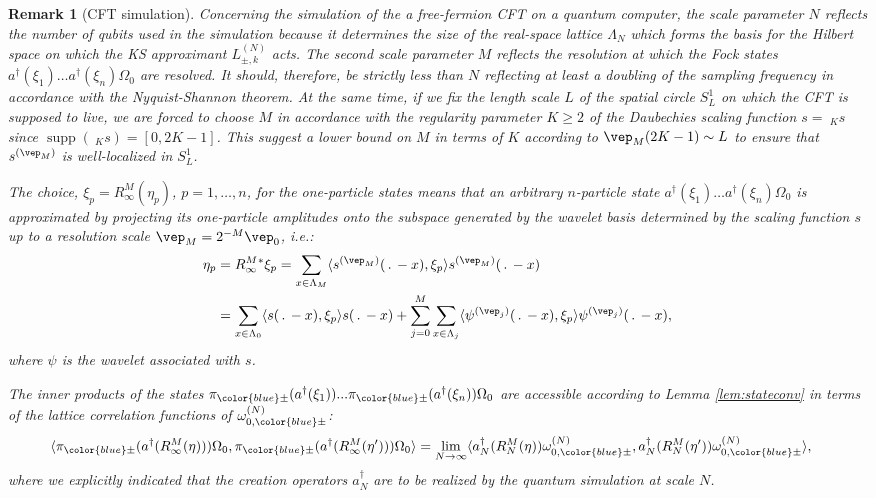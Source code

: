 \documentclass[a4paper, 11pt]{article}
\DeclareMathOperator{\1}{\mathds{1}}
\DeclareMathOperator{\supp}{supp}
\newtheorem{rem}[thm]{Remark}
\begin{document}
\begin{rem}[CFT simulation]
\label{rem:stateapprox}
Concerning the simulation of the a free-fermion CFT on a quantum computer, the scale parameter $N$ reflects the number of qubits used in the simulation because it determines the size of the real-space lattice $\Lambda_{N}$ which forms the basis for the Hilbert space on which the KS approximant $L^{(N)}_{\pm,k}$ acts. The second scale parameter $M$ reflects the resolution at which the Fock states $a^{\dagger}(\xi_{1})\dots a^{\dagger}(\xi_{n})\Omega_{0}$ are resolved. It should, therefore, be strictly less than $N$ reflecting at least a doubling of the sampling frequency in accordance with the Nyquist-Shannon theorem. At the same time, if we fix the length scale $L$ of the spatial circle $S^{1}_{L}$ on which the CFT is supposed to live, we are forced to choose $M$ in accordance with the regularity parameter $K\geq 2$ of the Daubechies scaling function $s=\!\ _{K}s$ since $\supp(\!\ _{K}s)=[0,2K-1]$. This suggest a lower bound on $M$ in terms of $K$ according to $\vep_{M}(2K-1)\sim L$ to ensure that $s^{(\vep_{M})}$ is well-localized in $S^{1}_{L}$.

The choice, $\xi_{p}=R^{M}_{\infty}(\eta_{p})$, $p=1,\dots,n$, for the one-particle states means that an arbitrary $n$-particle state $a^{\dagger}(\xi_{1})\dots a^{\dagger}(\xi_{n})\Omega_{0}$ is approximated by projecting its one-particle amplitudes onto the subspace generated by the wavelet basis determined by the scaling function $s$ up to a resolution scale $\vep_{M} = 2^{-M}\vep_{0}$, i.e.:
\begin{align*}
\eta_{p} & = R^{M}_{\infty}{}^{*}\xi_{p} = \sum_{x\in\Lambda_{M}}\langle s^{(\vep_{M})}(\!\ .\!\ -x),\xi_{p}\rangle s^{(\vep_{M})}(\!\ .\!\ -x) \\ 
& = \sum_{x\in\Lambda_{0}}\langle s(\!\ .\!\ -x),\xi_{p}\rangle s(\!\ .\!\ -x) + \sum_{j=0}^{M}\sum_{x\in\Lambda_{j}}\langle \psi^{(\vep_{j})}(\!\ .\!\ -x),\xi_{p}\rangle \psi^{(\vep_{j})}(\!\ .\!\ -x),
\end{align*}
where $\psi$ is the wavelet associated with $s$.

The inner products of the states $\pi_{{\color{blue}\pm}}(a^{\dagger}(\xi_{1}))...\pi_{{\color{blue}\pm}}(a^{\dagger}(\xi_{n}))\Omega_{0}$ are accessible according to Lemma \ref{lem:stateconv} in terms of the lattice correlation functions of $\omega^{(N)}_{0,{\color{blue}\pm}}$:
\begin{align*}
\langle \pi_{{\color{blue}\pm}}(a^{\dagger}(R^{M}_{\infty}(\eta)))\Omega_{0},\pi_{{\color{blue}\pm}}(a^{\dagger}(R^{M}_{\infty}(\eta')))\Omega_{0}\rangle & = \lim_{N\rightarrow\infty}\langle a^{\dagger}_{N}(R^{M}_{N}(\eta))\omega^{(N)}_{0,{\color{blue}\pm}},a^{\dagger}_{N}(R^{M}_{N}(\eta'))\omega^{(N)}_{0,{\color{blue}\pm}}\rangle,
\end{align*}
where we explicitly indicated that the creation operators $a^{\dagger}_{N}$ are to be realized by the quantum simulation at scale $N$.


\end{rem}
\end{document}
